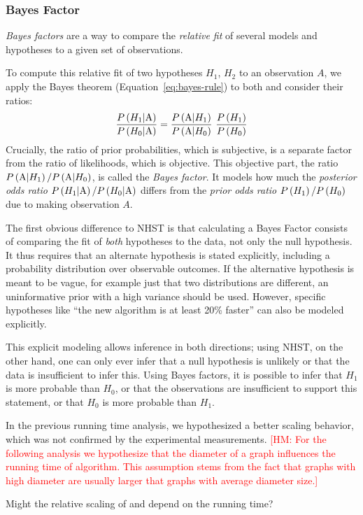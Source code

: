 \documentclass[algorithms,article,submit,moreauthors,pdftex]{Definitions/mdpi}
\newcommand{\changed}[1]{#1}
\newcommand{\removed}[1]{}
\newcommand{\hmey}[1]{\textcolor{red}{[HM: #1]}\xspace}
\begin{document}
\subsubsection{Bayes Factor}
\label{sec:stats:bayes-factor}
%
\emph{Bayes factors} are a way to compare the \emph{relative fit} of several models and hypotheses to a given set of observations.
\removed{While NHST evaluates the fit of observations to the null hypothesis and confidence intervals and credible intervals infer the range of plausible values of parameters in a model,}
\removed{ the Bayes factor between two hypotheses gives the ratio between their posterior probabilities.}
%
\changed{To compute this relative fit of two hypotheses $H_1$, $H_2$ to an observation $A$, we apply the Bayes theorem (Equation~\ref{eq:bayes-rule}) to both and consider their ratios:}
%
\[
 \frac{{P}\left(H_1 | \text{A}\right)}{{P}\left(H_0 | \text{A}\right)}  = \frac{{P}\left(\text{A} | H_1\right)}{ {P}\left(\text{A} | H_0\right)} \ \frac{{P}\left(H_1\right)}{{P}\left(H_0\right)}
\]
%
Crucially, the ratio of prior probabilities, which is subjective, is a separate factor from the ratio of likelihoods, which is objective.
This objective part, the ratio ${P}\left(\text{A} | H_1\right) /  {P}\left(\text{A} | H_0\right)$, is called the \emph{Bayes factor}.
\changed{It models how much the \emph{posterior odds ratio} ${P}\left(H_1 | \text{A}\right) / {P}\left(H_0 | \text{A}\right)$ differs from the \emph{prior odds ratio} ${P}\left(H_1\right) / {P}\left(H_0\right)$ due to making observation $A$.}

The first obvious difference to NHST is that calculating a Bayes Factor consists of comparing the fit of \emph{both} hypotheses to the data, not only the null hypothesis.
It thus requires that an alternate hypothesis is stated explicitly, including a probability distribution over observable outcomes.
If the alternative hypothesis is meant to be vague, for example just that two distributions are different, an uninformative prior with a high variance should be used.
However, specific hypotheses like ``the new algorithm is at least 20\% faster'' can also be modeled explicitly.

This explicit modeling allows inference in both directions;
using NHST, on the other hand, one can only ever infer that a null hypothesis is unlikely or that the data is insufficient to infer this.
Using Bayes factors, it is possible to infer that $H_1$ is more probable than $H_0$,
or that the observations are insufficient to support this statement, or that $H_0$ is more probable than $H_1$.

In the previous running time analysis, we hypothesized a better scaling behavior, which was not confirmed by the experimental measurements.
\hmey{For the following analysis we hypothesize that the diameter of a graph influences the running time of \kad algorithm. This assumption
  stems from the fact that graphs with high diameter are usually larger that graphs with average diameter size.}
\removed{However, the graphs with high diameter are larger than average and a cursory complexity analysis of the \kad algorithm suggests that the diameter has an influence on the running time.}
Might the relative scaling of \kad and \rk depend on the running time?
\end{document}
